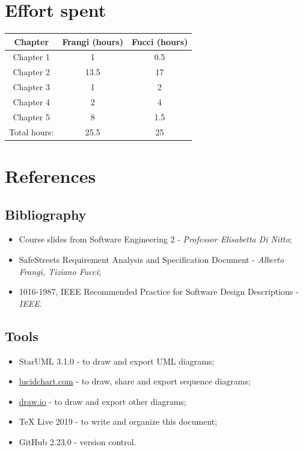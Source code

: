 \documentclass[12pt,a4paper]{report}
\begin{document}
	\chapter{Effort spent}
		\begin{table}[H]
			\centering
			\begin{tabular}[width = \textwidth]{|c|c|c|}
				\hline
				Chapter & Frangi (hours) & Fucci (hours)\\
				\hline
				\hline
				Chapter 1 & 1 & 0.5\\
				
				Chapter 2 & 13.5 & 17\\
				
				Chapter 3 & 1 & 2\\
				
				Chapter 4 & 2 & 4\\
				
				Chapter 5 & 8 & 1.5\\
				
				Total hours: & 25.5 & 25\\
				\hline
			\end{tabular}
			\label{tab: }
		\end{table}
	\chapter{References}
		\section{Bibliography}
		\begin{itemize}
			\item Course slides from Software Engineering 2 - \emph{Professor Elisabetta Di Nitto};
			\item SafeStreets Requirement Analysis and Specification Document - \emph{Alberto Frangi, Tiziano Fucci};
			\item 1016-1987, IEEE Recommended Practice for Software Design Descriptions - \emph{IEEE}.
		\end{itemize}
		\section{Tools}	
		\begin{itemize}		
		\item StarUML 3.1.0 - to draw and export UML diagrams;
		\item \url{lucidchart.com} - to draw, share and export sequence diagrams;
		\item \url{draw.io} - to draw and export other diagrams;
		\item TeX Live 2019 - to write and organize this document;
		\item GitHub 2.23.0 - version control.
		\end{itemize}
\end{document}

